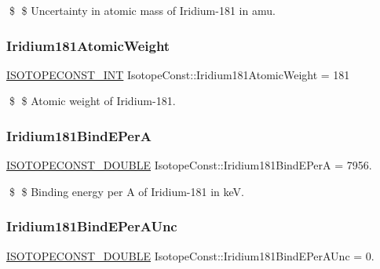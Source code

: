 \$ \$ Uncertainty in atomic mass of Iridium-\/181 in amu. \mbox{\label{group___isotope_const-_iridium-_ir181_ga95a4e7aea7f66972396300209cfed361}} 
\subsubsection{\texorpdfstring{Iridium181\+Atomic\+Weight}{Iridium181AtomicWeight}}
{\footnotesize\ttfamily \mbox{\hyperlink{group___isotope_const-_macros_ga5f18360b3e99483a35c32d789e62621c}{I\+S\+O\+T\+O\+P\+E\+C\+O\+N\+S\+T\+\_\+\+I\+NT}} Isotope\+Const\+::\+Iridium181\+Atomic\+Weight = 181}

\$ \$ Atomic weight of Iridium-\/181. \mbox{\label{group___isotope_const-_iridium-_ir181_gab720458223a61636fe81d69cbb3f1e8e}} 
\subsubsection{\texorpdfstring{Iridium181\+Bind\+E\+PerA}{Iridium181BindEPerA}}
{\footnotesize\ttfamily \mbox{\hyperlink{group___isotope_const-_macros_ga8f45a7272ce02c0b4c65c44636ed719a}{I\+S\+O\+T\+O\+P\+E\+C\+O\+N\+S\+T\+\_\+\+D\+O\+U\+B\+LE}} Isotope\+Const\+::\+Iridium181\+Bind\+E\+PerA = 7956.}

\$ \$ Binding energy per A of Iridium-\/181 in keV. \mbox{\label{group___isotope_const-_iridium-_ir181_ga42700defeaa2f4d76766181ba2b31374}} 
\subsubsection{\texorpdfstring{Iridium181\+Bind\+E\+Per\+A\+Unc}{Iridium181BindEPerAUnc}}
{\footnotesize\ttfamily \mbox{\hyperlink{group___isotope_const-_macros_ga8f45a7272ce02c0b4c65c44636ed719a}{I\+S\+O\+T\+O\+P\+E\+C\+O\+N\+S\+T\+\_\+\+D\+O\+U\+B\+LE}} Isotope\+Const\+::\+Iridium181\+Bind\+E\+Per\+A\+Unc = 0.}


